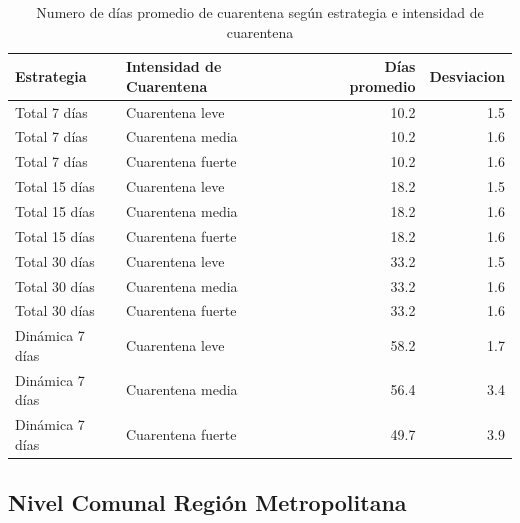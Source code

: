 \documentclass[]{article}
\begin{document}
\begin{table}

\caption{\label{tab:DiasCuar}Numero de días promedio de cuarentena según estrategia e intensidad de cuarentena}
\centering
\begin{tabular}[t]{llrr}
\toprule
Estrategia & Intensidad de Cuarentena & Días promedio & Desviacion\\
\midrule
Total 7 días & Cuarentena leve & 10.2 & 1.5\\
Total 7 días & Cuarentena media & 10.2 & 1.6\\
Total 7 días & Cuarentena fuerte & 10.2 & 1.6\\
Total 15 días & Cuarentena leve & 18.2 & 1.5\\
Total 15 días & Cuarentena media & 18.2 & 1.6\\
\addlinespace
Total 15 días & Cuarentena fuerte & 18.2 & 1.6\\
Total 30 días & Cuarentena leve & 33.2 & 1.5\\
Total 30 días & Cuarentena media & 33.2 & 1.6\\
Total 30 días & Cuarentena fuerte & 33.2 & 1.6\\
Dinámica 7 días & Cuarentena leve & 58.2 & 1.7\\
\addlinespace
Dinámica 7 días & Cuarentena media & 56.4 & 3.4\\
Dinámica 7 días & Cuarentena fuerte & 49.7 & 3.9\\
\bottomrule
\end{tabular}
\end{table}

\hypertarget{nivel-comunal-regiuxf3n-metropolitana}{%
\subsection{Nivel Comunal Región Metropolitana}\label{nivel-comunal-regiuxf3n-metropolitana}}
\end{document}
